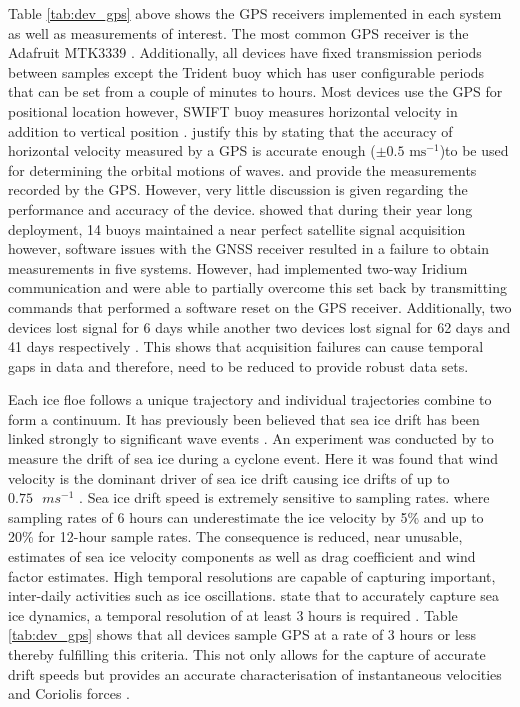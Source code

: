 Table \ref{tab:dev_gps} above shows the GPS receivers implemented in each system as well as measurements of interest. The most common GPS receiver is the Adafruit MTK3339 \textcite{mtk3339}. Additionally, all devices have fixed transmission periods between samples except the Trident buoy which has user configurable periods that can be set from a couple of minutes to hours. Most devices use the GPS for positional location however, SWIFT buoy measures horizontal velocity in addition to vertical position \cite{thomson2012wave}.  \textcite{thomson2012wave} justify this by stating that the accuracy of horizontal velocity measured by a GPS is accurate enough ($\pm 0.5 \text{ ms}^{-1}$)to be used for determining the orbital motions of waves. \textcite{kohout2015device} and \textcite{rabault2019open} provide the measurements recorded by the GPS. However, very little discussion is given regarding the performance and accuracy of the device. \textcite{doble2017robust} showed that during their year long deployment, 14 buoys maintained a near perfect satellite signal acquisition however, software issues with the GNSS receiver resulted in a failure to obtain measurements in five systems. However, \textcite{doble2017robust} had implemented two-way Iridium communication and were able to partially overcome this set back by transmitting commands that performed a software reset on the GPS receiver. Additionally, two devices lost signal for 6 days while another two devices lost signal for 62 days and 41 days respectively \cite{doble2013wave}. This shows that acquisition failures can cause temporal gaps in data and therefore, need to be reduced to provide robust data sets.

Each ice floe follows a unique trajectory \cite{lepparanta2001sea}  and individual trajectories combine to form a continuum. It has previously been believed that sea ice drift has been linked strongly to significant wave events \cite{alberello2019drift}. An experiment was conducted by \textcite{alberello2019drift} to measure the drift of sea ice during a cyclone event. Here it was found that wind velocity is the dominant driver of sea ice drift \cite{alberello2019drift} causing ice drifts of up to $0.75\text{ } ms^{-1}$ \cite{alberello2019drift}. Sea ice drift speed is extremely sensitive to sampling rates. \cite{alberello2019drift} where sampling rates of 6 hours can underestimate the ice velocity by 5\% \cite{alberello2019drift} and up to 20\% for 12-hour sample rates. The consequence is reduced, near unusable, estimates of sea ice velocity components as well as drag coefficient and wind factor estimates. High temporal resolutions are capable of capturing important, inter-daily activities such as ice oscillations. \textcite{alberello2019drift} state that to accurately capture sea ice dynamics, a temporal resolution of at least 3 hours is required \cite{alberello2019drift}. Table \ref{tab:dev_gps} shows that all devices sample GPS at a rate of 3 hours or less thereby fulfilling this criteria. This not only allows for the capture of accurate drift speeds but provides an accurate characterisation of instantaneous velocities and Coriolis forces \cite{alberello2019drift}.
 
